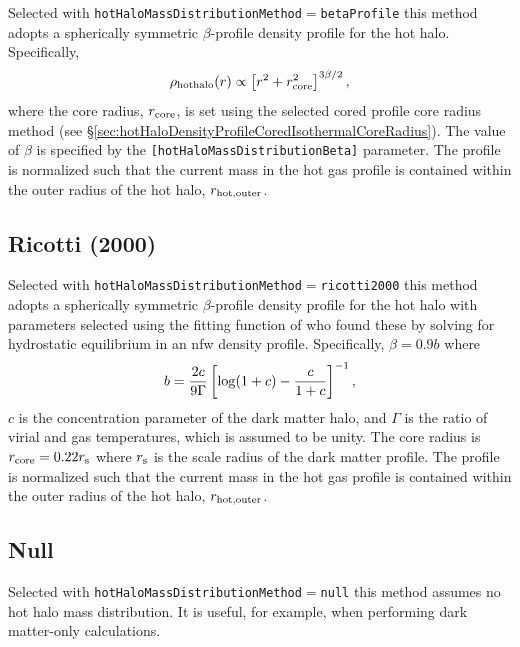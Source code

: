 Selected with {\tt hotHaloMassDistributionMethod}$=${\tt betaProfile} this method adopts a spherically symmetric $\beta$-profile density profile for the hot halo. Specifically,
\begin{equation}
 \rho_{\rm hot halo}(r) \propto \left[ r^2 + r_{\rm core}^2 \right]^{3\beta/2},
\end{equation}
where the core radius, $r_{\rm core}$, is set using the selected cored profile core radius method (see \S\ref{sec:hotHaloDensityProfileCoredIsothermalCoreRadius}). The value of $\beta$ is specified by the {\tt [hotHaloMassDistributionBeta]} parameter. The profile is normalized such that the current mass in the hot gas profile is contained within the outer radius of the hot halo, $r_{\rm hot, outer}$.

\subsection{Ricotti (2000)}\label{phys:hotHaloMassDistribution:hotHaloMassDistributionRicotti2000}

Selected with {\tt hotHaloMassDistributionMethod}$=${\tt ricotti2000} this method adopts a spherically symmetric $\beta$-profile density profile for the hot halo with parameters selected using the fitting function of \cite{ricotti_feedback_2000} who found these by solving for hydrostatic equilibrium in an \gls{nfw} density profile. Specifically, $\beta = 0.9 b$ where
\begin{equation}
 b = {2 c \over 9 \Gamma} \left[ \log(1+c) - {c\over 1+c}\right]^{-1},
\end{equation}
$c$ is the concentration parameter of the dark matter halo, and $\Gamma$ is the ratio of virial and gas temperatures, which is assumed to be unity. The core radius is $r_{\rm core} = 0.22 r_{\rm s}$ where $r_{\rm s}$ is the scale radius of the dark matter profile. The profile is normalized such that the current mass in the hot gas profile is contained within the outer radius of the hot halo, $r_{\rm hot, outer}$.

\subsection{Null}\label{phys:hotHaloMassDistribution:hotHaloMassDistributionNull}

Selected with {\tt hotHaloMassDistributionMethod}$=${\tt null} this method assumes no hot halo mass distribution. It is useful, for example, when performing dark matter-only calculations.

